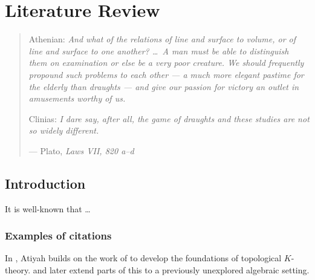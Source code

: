 %
%
%
%

\chapter{Literature Review}\label{C.LitReview}

\begin{quote}
Athenian: \textit{And what of the relations of line and surface to volume, or of line and 
surface to one another? \ldots\ A man must be able to distinguish them on examination or 
else be a very poor creature.  We should frequently propound such problems to each other 
--- a much more elegant pastime for the elderly than draughts --- and give our passion 
for victory an outlet in amusements worthy of us.} 

Clinias: \textit{I dare say, after all, the game of draughts and these studies are not so 
widely different.}
\vspace{0.1cm}

--- Plato, \emph{Laws VII, 820 a--d}
\end{quote}

\section{Introduction}\label{S.intro3}

It is well-known that \ldots

\subsection{Examples of citations}\label{SS.citations}

In \citep{Atiyah:1961,Atiyah:1966a,Atiyah:1966b}, Atiyah builds on the work of \citet{Adams:1962} to develop 
the foundations of topological $K$-theory.  \citet{LewMcG:2000} and \citet{McG:2002} later extend parts of 
this to a previously unexplored algebraic setting.
